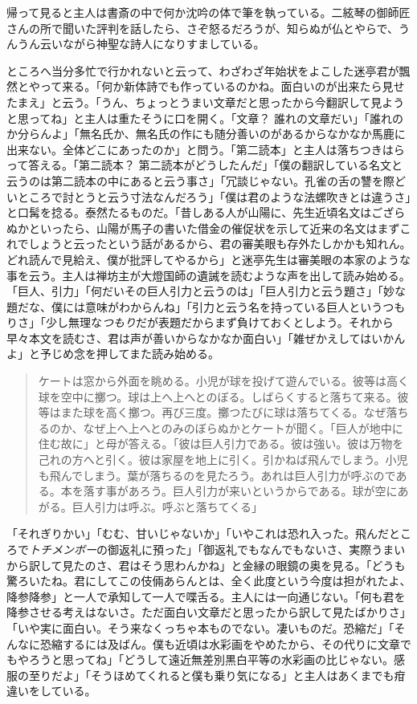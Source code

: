 \documentclass[12pt, openright]{book}
\begin{document}
帰って見ると主人は書斎の中で何か沈吟の体で筆を執っている。二絃琴の御師匠さんの所で聞いた評判を話したら、さぞ怒るだろうが、知らぬが仏とやらで、うんうん云いながら神聖な詩人になりすましている。

ところへ当分多忙で行かれないと云って、わざわざ年始状をよこした迷亭君が飄然とやって来る。「何か新体詩でも作っているのかね。面白いのが出来たら見せたまえ」と云う。「うん、ちょっとうまい文章だと思ったから今翻訳して見ようと思ってね」と主人は重たそうに口を開く。「文章？ 誰れの文章だい」「誰れのか分らんよ」「無名氏か、無名氏の作にも随分善いのがあるからなかなか馬鹿に出来ない。全体どこにあったのか」と問う。「第二読本」と主人は落ちつきはらって答える。「第二読本？ 第二読本がどうしたんだ」「僕の翻訳している名文と云うのは第二読本の中にあると云う事さ」「冗談じゃない。孔雀の舌の讐を際どいところで討とうと云う寸法なんだろう」「僕は君のような法螺吹きとは違うさ」と口髯を捻る。泰然たるものだ。「昔しある人が山陽に、先生近頃名文はござらぬかといったら、山陽が馬子の書いた借金の催促状を示して近来の名文はまずこれでしょうと云ったという話があるから、君の審美眼も存外たしかかも知れん。どれ読んで見給え、僕が批評してやるから」と迷亭先生は審美眼の本家のような事を云う。主人は禅坊主が大燈国師の遺誡を読むような声を出して読み始める。「巨人、引力」「何だいその巨人引力と云うのは」「巨人引力と云う題さ」「妙な題だな、僕には意味がわからんね」「引力と云う名を持っている巨人というつもりさ」「少し無理な\emph{つもり}だが表題だからまず負けておくとしよう。それから早々本文を読むさ、君は声が善いからなかなか面白い」「雑ぜかえしてはいかんよ」と予じめ念を押してまた読み始める。

\blockquote{ケートは窓から外面を眺める。小児が球を投げて遊んでいる。彼等は高く球を空中に擲つ。球は上へ上へとのぼる。しばらくすると落ちて来る。彼等はまた球を高く擲つ。再び三度。擲つたびに球は落ちてくる。なぜ落ちるのか、なぜ上へ上へとのみのぼらぬかとケートが聞く。「巨人が地中に住む故に」と母が答える。「彼は巨人引力である。彼は強い。彼は万物を己れの方へと引く。彼は家屋を地上に引く。引かねば飛んでしまう。小児も飛んでしまう。葉が落ちるのを見たろう。あれは巨人引力が呼ぶのである。本を落す事があろう。巨人引力が来いというからである。球が空にあがる。巨人引力は呼ぶ。呼ぶと落ちてくる」}

「それぎりかい」「むむ、甘いじゃないか」「いやこれは恐れ入った。飛んだところで\emph{トチメンボー}の御返礼に預った」「御返礼でもなんでもないさ、実際うまいから訳して見たのさ、君はそう思わんかね」と金縁の眼鏡の奥を見る。「どうも驚ろいたね。君にしてこの伎倆あらんとは、全く此度という今度は担がれたよ、降参降参」と一人で承知して一人で喋舌る。主人には一向通じない。「何も君を降参させる考えはないさ。ただ面白い文章だと思ったから訳して見たばかりさ」「いや実に面白い。そう来なくっちゃ本ものでない。凄いものだ。恐縮だ」「そんなに恐縮するには及ばん。僕も近頃は水彩画をやめたから、その代りに文章でもやろうと思ってね」「どうして遠近無差別黒白平等の水彩画の比じゃない。感服の至りだよ」「そうほめてくれると僕も乗り気になる」と主人はあくまでも疳違いをしている。
\end{document}
